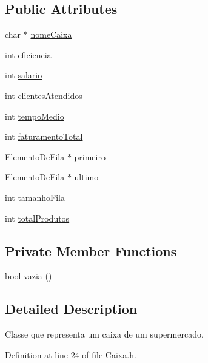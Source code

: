 \subsection*{Public Attributes}
\begin{DoxyCompactItemize}
\item 
char $\ast$ \hyperlink{classProjeto1_1_1Caixa_a3396ba1f8fd63194ff225ffaf0d5268c}{nomeCaixa}
\item 
int \hyperlink{classProjeto1_1_1Caixa_aeb2c7dca9680e644f88f3bb9eb606c2a}{eficiencia}
\item 
int \hyperlink{classProjeto1_1_1Caixa_ad9f8c9b65400bd1db9004dbb3c9f18ea}{salario}
\item 
int \hyperlink{classProjeto1_1_1Caixa_ac836b24da5b62bd7d9382ada7d0222a4}{clientesAtendidos}
\item 
int \hyperlink{classProjeto1_1_1Caixa_a2a7071befa8bd345aae8bc42b9d08e24}{tempoMedio}
\item 
int \hyperlink{classProjeto1_1_1Caixa_aab5d05e900f913ed7d705bcb2c4e899d}{faturamentoTotal}
\item 
\hyperlink{classProjeto1_1_1ElementoDeFila}{ElementoDeFila} $\ast$ \hyperlink{classProjeto1_1_1Caixa_a81f31c6847218308e3285c385675c3d9}{primeiro}
\item 
\hyperlink{classProjeto1_1_1ElementoDeFila}{ElementoDeFila} $\ast$ \hyperlink{classProjeto1_1_1Caixa_adf2463f6ed9828bed7c3def83ab1fd95}{ultimo}
\item 
int \hyperlink{classProjeto1_1_1Caixa_a6a968db0d50c39f1429591190ad34791}{tamanhoFila}
\item 
int \hyperlink{classProjeto1_1_1Caixa_ab02cf6a92e30a62022a04335742f2767}{totalProdutos}
\end{DoxyCompactItemize}
\subsection*{Private Member Functions}
\begin{DoxyCompactItemize}
\item 
bool \hyperlink{classProjeto1_1_1Caixa_a099014e9d3fee7c7286ca347bc7955f6}{vazia} ()
\end{DoxyCompactItemize}


\subsection{Detailed Description}
Classe que representa um caixa de um supermercado. 

Definition at line 24 of file Caixa.h.



